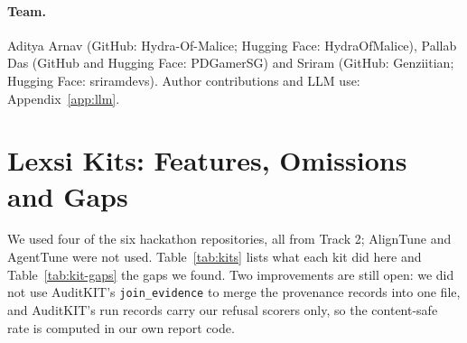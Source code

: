 \documentclass[11pt]{article}
\begin{document}
\paragraph{Team.} Aditya Arnav (GitHub: Hydra-Of-Malice; Hugging Face: HydraOfMalice), Pallab Das (GitHub and
Hugging Face: PDGamerSG) and Sriram (GitHub: Genziitian; Hugging Face: sriramdevs). Author contributions and LLM use: Appendix~\ref{app:llm}.


\section{Lexsi Kits: Features, Omissions and Gaps}\label{app:kits}

We used four of the six hackathon repositories, all from Track 2; AlignTune and AgentTune were not used.
Table~\ref{tab:kits} lists what each kit did here and Table~\ref{tab:kit-gaps} the gaps we found. Two improvements
are still open: we did not use AuditKIT's \texttt{join\_evidence} to merge the provenance records into one file, and
AuditKIT's run records carry our refusal scorers only, so the content-safe rate is computed in our own report code.
\end{document}
